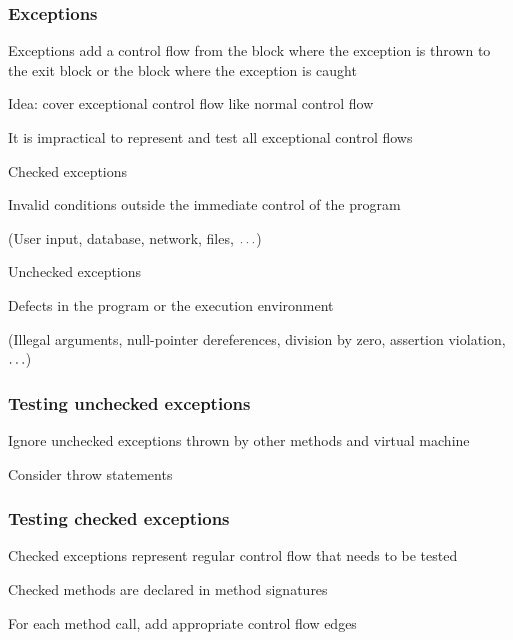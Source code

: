 \subsubsection{Exceptions}
\enumstart
	\item Exceptions add a control flow from the block where the exception is thrown to the exit block or the block where the exception is caught
	\item Idea: cover exceptional control flow like normal control flow
	\enumstart
		\item It is impractical to represent and test all exceptional control flows
	\enumend
	\item Checked exceptions
	\enumstart
		\item Invalid conditions outside the immediate control of the program
		\item (User input, database, network, files, $\mathellipsis$)
	\enumend
	\item Unchecked exceptions
	\enumstart
		\item Defects in the program or the execution environment
		\item (Illegal arguments, null-pointer dereferences, division by zero, assertion violation, $\mathellipsis$)
	\enumend
\enumend

\subsubsection{Testing unchecked exceptions}
\enumstart
	\item Ignore unchecked exceptions thrown by other methods and virtual machine
	\item Consider throw statements
\enumend

\subsubsection{Testing checked exceptions}
\enumstart
	\item Checked exceptions represent regular control flow that needs to be tested
	\item Checked methods are declared in method signatures
	\item For each method call, add appropriate control flow edges
\enumend
